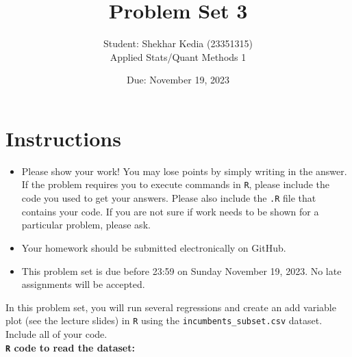 \documentclass[12pt,letterpaper]{article}
\title{Problem Set 3}
\date{Due: November 19, 2023}
\author{Student: Shekhar Kedia (23351315)\\
	Applied Stats/Quant Methods 1}
\begin{document}
	\maketitle
	\section*{Instructions}
	\begin{itemize}
		\item Please show your work! You may lose points by simply writing in the answer. If the problem requires you to execute commands in \texttt{R}, please include the code you used to get your answers. Please also include the \texttt{.R} file that contains your code. If you are not sure if work needs to be shown for a particular problem, please ask.
	\item Your homework should be submitted electronically on GitHub.
	\item This problem set is due before 23:59 on Sunday November 19, 2023. No late assignments will be accepted.

	\end{itemize}

		\vspace{.25cm}
	
\noindent In this problem set, you will run several regressions and create an add variable plot (see the lecture slides) in \texttt{R} using the \texttt{incumbents\_subset.csv} dataset. Include all of your code.\\

\textbf{\texttt{R} code to read the dataset:}
  

	\vspace{.5cm}
\pagebreak
\end{document}
